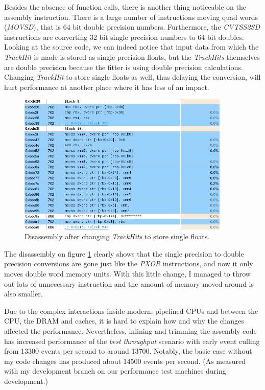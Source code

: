 \documentclass[12pt]{article}
\begin{document}
Besides the absence of function calls, there is another thing noticeable on the assembly instruction. There is a large number of instructions moving quad words (\textit{MOVSD}), that is 64 bit double precision numbers. Furthermore, the \textit{CVTSS2SD} instructions are converting 32 bit single precision numbers to 64 bit doubles. Looking at the source code, we can indeed notice that input data from which the \textit{TrackHit} is made is stored as single precision floats, but the \textit{TrackHits} themselves are double precision because the fitter is using double precision calculations. Changing \textit{TrackHit} to store single floats as well, thus delaying the conversion, will hurt performance at another place where it has less of an impact.

\begin{figure}[H]
	\begin{center}
		\includegraphics[width=0.9\textwidth]{kalmanfit_disasm_opt_asm_nocvt}
	\end{center}
	\caption{Disassembly after changing \textit{TrackHits} to store single floats.}
	\label{fig_kalman_disasm_src_nocvt}
\end{figure}

The disassembly on figure \ref{fig_kalman_disasm_src_nocvt} clearly shows that the single precision to double precision conversions are gone just like the \textit{PXOR} instructions, and now it only moves double word memory units. With this little change, I managed to throw out lots of unnecessary instruction and the amount of memory moved around is also smaller.

Due to the complex interactions inside modern, pipelined CPUs and between the CPU, the DRAM and caches, it is hard to explain how and why the changes affected the performance. Nevertheless, inlining and trimming the assembly code has increased performance of the \textit{best throughput} scenario with early event culling from 13300 events per second to around 13700. Notably, the basic case without my code changes has produced about 14500 events per second. \small (As measured with my development branch on our performance test machines during development.) \normalsize
\end{document}
